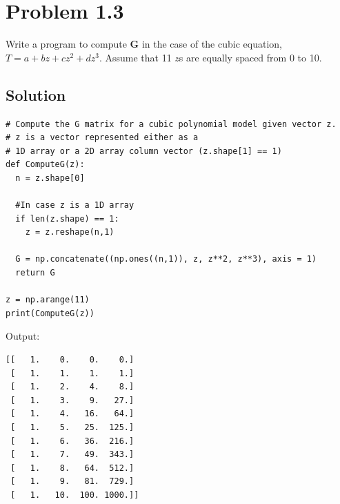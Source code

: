 \section*{Problem 1.3}
Write a program to compute $\mathbf{G}$ in the case of the cubic equation, $T = a + bz + cz^2 + dz^3$. Assume that 11 $z$s are equally spaced from 0 to 10.
\subsection*{Solution}
\begin{verbatim}
# Compute the G matrix for a cubic polynomial model given vector z.
# z is a vector represented either as a 
# 1D array or a 2D array column vector (z.shape[1] == 1)
def ComputeG(z):
  n = z.shape[0]
  
  #In case z is a 1D array
  if len(z.shape) == 1:
    z = z.reshape(n,1)

  G = np.concatenate((np.ones((n,1)), z, z**2, z**3), axis = 1)
  return G

z = np.arange(11)
print(ComputeG(z))
\end{verbatim}

Output:

\begin{verbatim}
[[   1.    0.    0.    0.]
 [   1.    1.    1.    1.]
 [   1.    2.    4.    8.]
 [   1.    3.    9.   27.]
 [   1.    4.   16.   64.]
 [   1.    5.   25.  125.]
 [   1.    6.   36.  216.]
 [   1.    7.   49.  343.]
 [   1.    8.   64.  512.]
 [   1.    9.   81.  729.]
 [   1.   10.  100. 1000.]]
    
\end{verbatim}